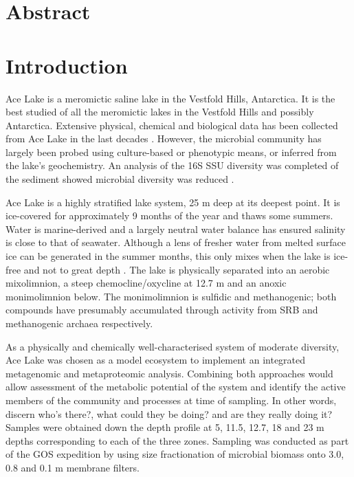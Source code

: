 \section{Abstract}



\section{Introduction}
Ace Lake is a meromictic saline lake in the Vestfold Hills, Antarctica. 
It is the best studied of all the meromictic lakes in the Vestfold Hills and possibly Antarctica.
Extensive physical, chemical and biological data has been collected from Ace Lake in the last decades \cite{Rankin1999}.
However, the microbial community has largely been probed using culture-based or phenotypic means, or inferred from the lake's geochemistry.
An analysis of the 16S \ac{SSU} diversity was completed of the sediment showed microbial diversity was reduced \cite{Bowman2000a}.

Ace Lake is a highly stratified lake system, 25 m deep at its deepest point.
It is ice-covered for approximately 9 months of the year and thaws some summers. %
Water is marine-derived and a largely neutral water balance has ensured salinity is close to that of seawater.
Although a lens of fresher water from melted surface ice can be generated in the summer months, this only mixes when the lake is ice-free and not to great depth \cite{Rankin1999}.
The lake is physically separated into an aerobic mixolimnion, a steep chemocline/oxycline at 12.7 m and an anoxic monimolimnion below.
The monimolimnion is sulfidic and methanogenic; both compounds have presumably accumulated through activity from \ac{SRB} and methanogenic archaea respectively.

As a physically and chemically well-characterised system of moderate diversity, Ace Lake was chosen as a model ecosystem to implement an integrated metagenomic and metaproteomic analysis.
Combining both approaches would allow assessment of the metabolic potential of the system and identify the active members of the community and processes at time of sampling.
In other words, discern who's there?, what could they be doing? and are they really doing it?
Samples were obtained down the depth profile at 5, 11.5, 12.7, 18 and 23 m depths corresponding to each of the three zones.
Sampling was conducted as part of the \ac{GOS} expedition \cite{Rusch2007} by using size fractionation of microbial biomass onto 3.0, 0.8 and 0.1 \textmu{}m membrane filters.

